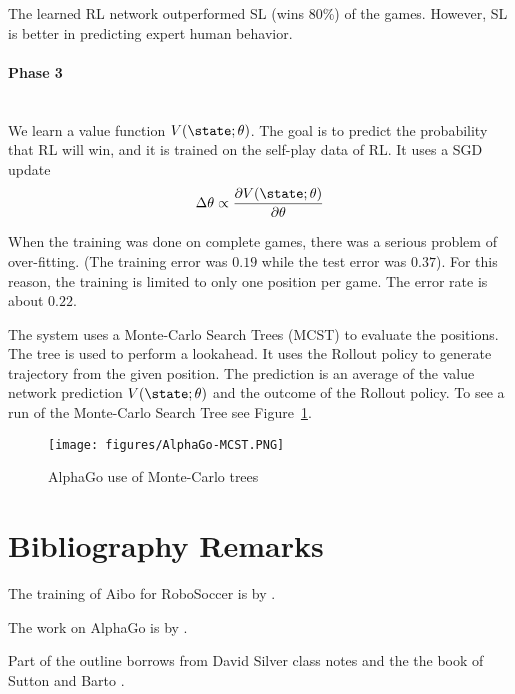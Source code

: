 The learned RL network outperformed SL (wins 80\%) of the games.
However, SL is better in predicting expert human behavior.

\paragraph{Phase 3}\ \\
We learn a value function $V(\state;\theta)$. The goal is to predict
the probability that RL will win, and it is trained on the self-play
data of RL. It uses a SGD update
\[
\Delta \theta \propto \frac{\partial V(\state;\theta)}{\partial
\theta}
\]

When the training was done on complete games, there was a serious
problem of over-fitting. (The training error was $0.19$ while the
test error was $0.37$). For this reason, the training is limited to
only one position per game. The error rate is about $0.22$.

The system uses a Monte-Carlo Search Trees (MCST) to evaluate the
positions. The tree is used to perform a lookahead. It uses the
Rollout policy to generate trajectory from the given position. The
prediction is an average of the value network prediction
$V(\state;\theta)$ and the outcome of the Rollout policy. To see a
run of the Monte-Carlo Search Tree see
Figure~\ref{fig:AlphaGo-MCST}.


\begin{figure}
  \begin{centering}
  \texttt{[image: figures/AlphaGo-MCST.PNG]}\\
  \caption{AlphaGo use of Monte-Carlo trees}\label{fig:AlphaGo-MCST}
  \end{centering}
\end{figure}

\section{Bibliography Remarks}

The training of Aibo for RoboSoccer is by \cite{KohlS04}.

The work on AlphaGo is by \cite{SilverHMGSDSAPL16}.

Part of the outline borrows from David Silver class notes and the
the book of Sutton and Barto \cite{SuttonB98}.
